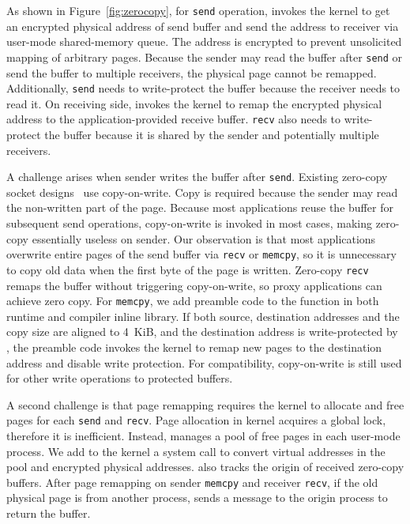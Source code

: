 As shown in Figure~\ref{fig:zerocopy}, for \texttt{send} operation, \libipc{} invokes the kernel to get an encrypted physical address of send buffer and send the address to receiver via user-mode shared-memory queue.
The address is encrypted to prevent unsolicited mapping of arbitrary pages.
Because the sender may read the buffer after \texttt{send} or send the buffer to multiple receivers, the physical page cannot be remapped.
Additionally, \texttt{send} needs to write-protect the buffer because the receiver needs to read it.
On receiving side, \libipc{} invokes the kernel to remap the encrypted physical address to the application-provided receive buffer.
\texttt{recv} also needs to write-protect the buffer because it is shared by the sender and potentially multiple receivers.

A challenge arises when sender writes the buffer after \texttt{send}.
Existing zero-copy socket designs~\cite{thadani1995efficient,chu1996zero} use copy-on-write. Copy is required because the sender may read the non-written part of the page.
Because most applications reuse the buffer for subsequent send operations, copy-on-write is invoked in most cases, making zero-copy essentially useless on sender.
Our observation is that most applications overwrite entire pages of the send buffer via \texttt{recv} or \texttt{memcpy}, so it is unnecessary to copy old data when the first byte of the page is written.
Zero-copy \texttt{recv} remaps the buffer without triggering copy-on-write, so proxy applications can achieve zero copy.
For \texttt{memcpy}, we add preamble code to the function in both \libipc{} runtime and compiler inline library. If both source, destination addresses and the copy size are aligned to 4~KiB, and the destination address is write-protected by \libipc{}, the preamble code invokes the kernel to remap new pages to the destination address and disable write protection.
For compatibility, copy-on-write is still used for other write operations to protected buffers.

A second challenge is that page remapping requires the kernel to allocate and free pages for each \texttt{send} and \texttt{recv}. Page allocation in kernel acquires a global lock, therefore it is inefficient. Instead, \libipc{} manages a pool of free pages in each user-mode process.
We add to the kernel a system call to convert virtual addresses in the pool and encrypted physical addresses.
\libipc{} also tracks the origin of received zero-copy buffers.
After page remapping on sender \texttt{memcpy} and receiver \texttt{recv}, if the old physical page is from another process, \libipc{} sends a message to the origin process to return the buffer.



